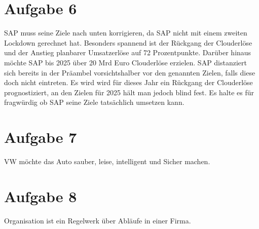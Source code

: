 \documentclass{article}
\begin{document}
	\section*{Aufgabe 6}
	SAP muss seine Ziele nach unten korrigieren, da SAP nicht mit einem zweiten Lockdown gerechnet hat. Besonders spannend ist der Rückgang der Clouderlöse und der Anstieg planbarer Umsatzerlöse auf 72 Prozentpunkte. Darüber hinaus möchte SAP bis 2025 über 20 Mrd Euro Clouderlöse erzielen. SAP distanziert sich bereits in der Präambel vorsichtshalber vor den genannten Zielen, falls diese doch nicht eintreten. Es wird wird für dieses Jahr ein Rückgang der Clouderlöse prognostiziert, an den Zielen für 2025 hält man jedoch blind fest. Es halte es für fragwürdig ob SAP seine Ziele tatsächlich umsetzen kann.
	\section*{Aufgabe 7}
	VW möchte das Auto sauber, leise, intelligent und Sicher machen.
	\section*{Aufgabe 8}
	Organisation ist ein Regelwerk über Abläufe in einer Firma.
\end{document}
